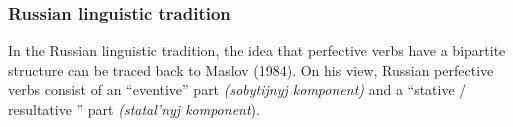 
\subsubsection{Russian linguistic tradition}
In the Russian linguistic tradition, the idea that perfective verbs  have a bipartite structure can be traced back to Maslov (1984). On his view, Russian perfective verbs  consist of an ``eventive'' part \textit{(sobytijnyj komponent)} and a ``stative / resultative '' part \textit{(statal'nyj komponent}).

